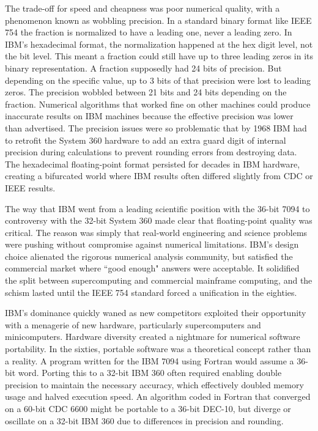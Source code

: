 The trade-off for speed and cheapness was poor numerical quality, with a phenomenon known as wobbling precision. In a standard binary format like IEEE 754 the fraction is normalized to have a leading one, never a leading zero. In IBM's hexadecimal format, the normalization happened at the hex digit level, not the bit level. This meant a fraction could still have up to three leading zeros in its binary representation. A fraction supposedly had 24 bits of precision. But depending on the specific value, up to 3 bits of that precision were lost to leading zeros. The precision wobbled between 21 bits and 24 bits depending on the fraction. Numerical algorithms that worked fine on other machines could produce inaccurate results on IBM machines because the effective precision was lower than advertised. The precision issues were so problematic that by 1968 IBM had to retrofit the System 360 hardware to add an extra guard digit of internal precision during calculations to prevent rounding errors from destroying data. The hexadecimal floating-point format persisted for decades in IBM hardware, creating a bifurcated world where IBM results often differed slightly from CDC or IEEE results. 

The way that IBM went from a leading scientific position with the 36-bit 7094 to controversy with the 32-bit System 360 made clear that floating-point quality was critical. The reason was simply that real-world engineering and science problems were pushing without compromise against numerical limitations. IBM’s design choice alienated the rigorous numerical analysis community, but satisfied the commercial market where “good enough" answers were acceptable. It solidified the split between supercomputing and commercial mainframe computing, and the schism lasted until the IEEE 754 standard forced a unification in the eighties. 

IBM’s dominance quickly waned as new competitors exploited their opportunity with a menagerie of new hardware, particularly supercomputers and minicomputers. Hardware diversity created a nightmare for numerical software portability. In the sixties, portable software was a theoretical concept rather than a reality. A program written for the IBM 7094 using Fortran would assume a 36-bit word. Porting this to a 32-bit IBM 360 often required enabling double precision to maintain the necessary accuracy, which effectively doubled memory usage and halved execution speed. An algorithm coded in Fortran that converged on a 60-bit CDC 6600 might be portable to a 36-bit DEC-10, but diverge or oscillate on a 32-bit IBM 360 due to differences in precision and rounding. 


